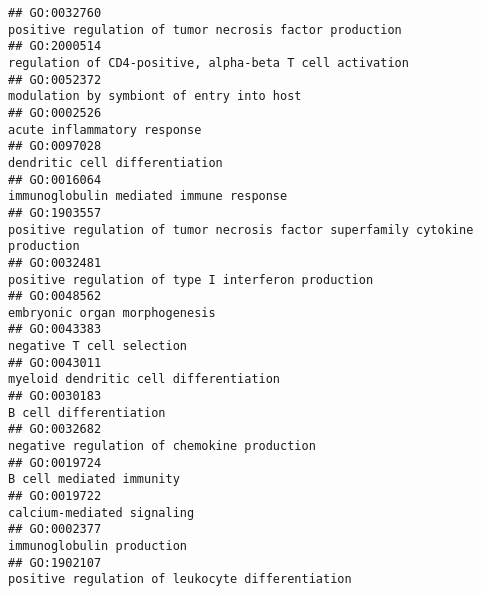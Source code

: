 \documentclass[
]{article}
\begin{document}
\begin{verbatim}
## GO:0032760                                                                                          positive regulation of tumor necrosis factor production
## GO:2000514                                                                                         regulation of CD4-positive, alpha-beta T cell activation
## GO:0052372                                                                                                        modulation by symbiont of entry into host
## GO:0002526                                                                                                                      acute inflammatory response
## GO:0097028                                                                                                                   dendritic cell differentiation
## GO:0016064                                                                                                          immunoglobulin mediated immune response
## GO:1903557                                                                     positive regulation of tumor necrosis factor superfamily cytokine production
## GO:0032481                                                                                              positive regulation of type I interferon production
## GO:0048562                                                                                                                    embryonic organ morphogenesis
## GO:0043383                                                                                                                        negative T cell selection
## GO:0043011                                                                                                           myeloid dendritic cell differentiation
## GO:0030183                                                                                                                           B cell differentiation
## GO:0032682                                                                                                      negative regulation of chemokine production
## GO:0019724                                                                                                                         B cell mediated immunity
## GO:0019722                                                                                                                       calcium-mediated signaling
## GO:0002377                                                                                                                        immunoglobulin production
## GO:1902107                                                                                                 positive regulation of leukocyte differentiation

\end{verbatim}
\end{document}
